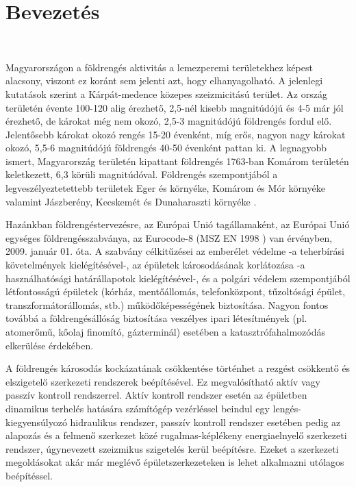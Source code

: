 
\chapter{Bevezetés}                  

{\ }

Magyarországon a földrengés aktivitás a lemezperemi területekhez  képest alacsony, viszont ez koránt sem jelenti azt, hogy elhanyagolható. A jelenlegi kutatások szerint a Kárpát-medence közepes szeizmicitású terület. Az ország területén évente 100-120 alig érezhető, 2,5-nél kisebb magnitúdójú  és  4-5 már jól érezhető, de károkat még nem okozó, 2,5-3 magnitúdójú földrengés fordul elő.  Jelentősebb károkat okozó rengés 15-20 évenként, míg erős, nagyon nagy károkat okozó, 5,5-6 magnitúdójú földrengés 40-50 évenként pattan ki. A legnagyobb ismert, Magyarország területén kipattant  földrengés 1763-ban  Komárom területén keletkezett, 6,3 körüli magnitúdóval. Földrengés szempontjából a legveszélyeztetettebb területek Eger és környéke, Komárom és Mór környéke valamint Jászberény, Kecskemét és Dunaharaszti környéke \cite{mónus,évkönyv}. 

Hazánkban földrengéstervezésre, az Európai Unió tagállamaként,  az Európai Unió egységes földrengésszabványa, az Eurocode-8 (MSZ EN 1998 \cite{ec8}) van érvényben, 2009. január 01. óta. A szabvány célkitűzései az emberélet védelme -a teherbírási követelmények kielégítésével-, az épületek  károsodásának korlátozása -a használhatósági határállapotok kielégítésével-, és a polgári védelem szempontjából létfontosságú épületek (kórház, mentőállomás, telefonközpont, tűzoltósági épület, transzformátorállomás, stb.) működőképességének biztosítása. Nagyon fontos továbbá a földrengésállóság biztosítása veszélyes ipari létesítmények (pl. atomerőmű, kőolaj finomító, gázterminál) esetében  a katasztrófahalmozódás elkerülése érdekében.

A földrengés károsodás kockázatának csökkentése történhet a rezgést csökkentő és elszigetelő szerkezeti rendszerek beépítésével. Ez megvalósítható  aktív vagy passzív kontroll rendszerrel. Aktív kontroll rendszer esetén az épületben dinamikus terhelés hatására számítógép vezérléssel beindul egy lengés-kiegyensúlyozó hidraulikus rendszer, passzív kontroll rendszer  esetében pedig az alapozás és a felmenő szerkezet közé rugalmas-képlékeny energiaelnyelő  szerkezeti rendszer, úgynevezett szeizmikus szigetelés kerül beépítésre. Ezeket a  szerkezeti megoldásokat akár már meglévő épületszerkezeteken is lehet alkalmazni utólagos beépítéssel. 

